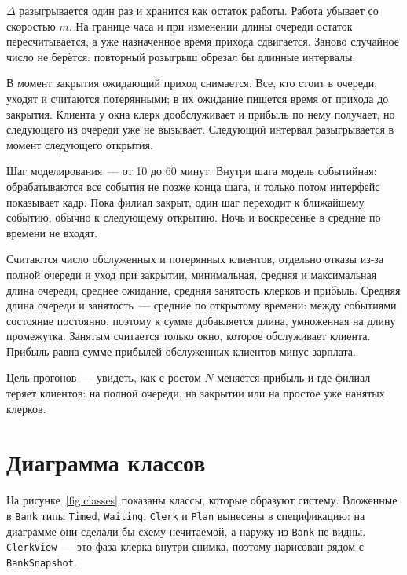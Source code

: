 \documentclass[a4paper,12pt]{article}
\begin{document}
\(\Delta\) разыгрывается один раз и хранится как остаток работы. Работа убывает со скоростью \(m\). На границе часа и при изменении длины очереди остаток пересчитывается, а уже назначенное время прихода сдвигается. Заново случайное число не берётся: повторный розыгрыш обрезал бы длинные интервалы.

В момент закрытия ожидающий приход снимается. Все, кто стоит в очереди, уходят и считаются потерянными; в их ожидание пишется время от прихода до закрытия. Клиента у окна клерк дообслуживает и прибыль по нему получает, но следующего из очереди уже не вызывает. Следующий интервал разыгрывается в момент следующего открытия.

Шаг моделирования~--- от 10 до 60 минут. Внутри шага модель событийная: обрабатываются все события не позже конца шага, и только потом интерфейс показывает кадр. Пока филиал закрыт, один шаг переходит к ближайшему событию, обычно к следующему открытию. Ночь и воскресенье в средние по времени не входят.

Считаются число обслуженных и потерянных клиентов, отдельно отказы из-за полной очереди и уход при закрытии, минимальная, средняя и максимальная длина очереди, среднее ожидание, средняя занятость клерков и прибыль. Средняя длина очереди и занятость~--- средние по открытому времени: между событиями состояние постоянно, поэтому к сумме добавляется длина, умноженная на длину промежутка. Занятым считается только окно, которое обслуживает клиента. Прибыль равна сумме прибылей обслуженных клиентов минус зарплата.

Цель прогонов~--- увидеть, как с ростом \(N\) меняется прибыль и где филиал теряет клиентов: на полной очереди, на закрытии или на простое уже нанятых клерков.

\newpage

\section{Диаграмма классов}

На рисунке~\ref{fig:classes} показаны классы, которые образуют систему. Вложенные в \texttt{Bank} типы \texttt{Timed}, \texttt{Waiting}, \texttt{Clerk} и \texttt{Plan} вынесены в спецификацию: на диаграмме они сделали бы схему нечитаемой, а наружу из \texttt{Bank} не видны. \texttt{ClerkView}~--- это фаза клерка внутри снимка, поэтому нарисован рядом с \texttt{BankSnapshot}.
\end{document}
